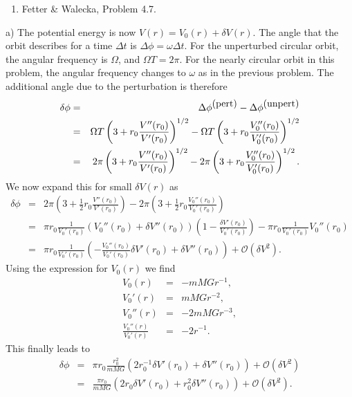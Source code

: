 \documentclass[letterpaper,11pt]{article}
\begin{document}
\begin{enumerate}[resume]
 \item Fetter \& Walecka, Problem 4.7.
\end{enumerate}

a) The potential energy is now $V(r) = V_0(r) + \delta V(r)$.  The angle that the orbit describes for a time $\Delta t$ is $\Delta\phi = \omega \Delta t$.  For the unperturbed circular orbit, the angular frequency is $\Omega$, and $\Omega T = 2\pi$.  For the nearly circular orbit in this problem, the angular frequency changes to $\omega$ as in the previous problem.  The additional angle due to the perturbation is therefore
\begin{eqnarray*}
 \delta\phi & = & \Delta\phi^{\hbox{(pert)}} - \Delta\phi^{\hbox{(unpert)}} \\
 & = & \Omega T \left(3 + r_0 \frac{V''(r_0)}{V'(r_0)}\right)^{1/2} - \Omega T \left(3 + r_0 \frac{V_0''(r_0)}{V_0'(r_0)}\right)^{1/2} \\
 & = & 2\pi \left(3 + r_0 \frac{V''(r_0)}{V'(r_0)}\right)^{1/2} - 2\pi \left(3 + r_0 \frac{V_0''(r_0)}{V_0'(r_0)}\right)^{1/2}.
\end{eqnarray*}
We now expand this for small $\delta V(r)$ as
\begin{eqnarray*}
 \delta\phi & = & 2\pi \left(3 + \frac{1}{2} r_0 \frac{V''(r_0)}{V'(r_0)}\right) - 2\pi \left(3 + \frac{1}{2} r_0 \frac{V_0''(r_0)}{V_0'(r_0)}\right) \\
 & = & \pi r_0 \frac{1}{V_0'(r_0)} \left(V_0''(r_0) + \delta V''(r_0)\right) \left(1 - \frac{\delta V'(r_0)}{V_0'(r_0)}\right) - \pi r_0 \frac{1}{V_0'(r_0)} V_0''(r_0) \\
 & = & \pi r_0 \frac{1}{V_0'(r_0)} \left( - \frac{V_0''(r_0)}{V_0'(r_0)} \delta V'(r_0) + \delta V''(r_0)\right) + \mathcal{O}(\delta V^2).
\end{eqnarray*}
Using the expression for $V_0(r)$ we find
\begin{eqnarray*}
 V_0(r) & = & -mMGr^{-1}, \\
 V_0'(r) & = & mMGr^{-2}, \\
 V_0''(r) & = & -2mMGr^{-3}, \\
 \frac{V_0''(r)}{V_0'(r)} & = & -2 r^{-1}.
\end{eqnarray*}
This finally leads to
\begin{eqnarray*}
 \delta\phi & = & \pi r_0 \frac{r_0^2}{mMG} \left( 2 r_0^{-1} \delta V'(r_0) + \delta V''(r_0)\right) + \mathcal{O}(\delta V^2) \\
 & = & \frac{\pi r_0}{mMG} \left( 2 r_0 \delta V'(r_0) + r_0^2 \delta V''(r_0)\right) + \mathcal{O}(\delta V^2).
\end{eqnarray*}
\end{document}
